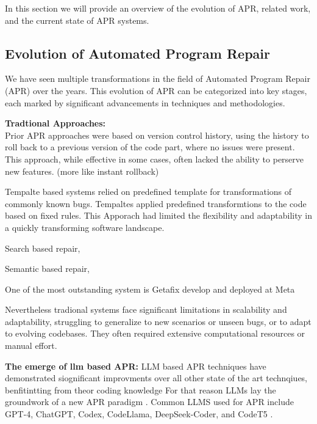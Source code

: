 In this section we will provide an overview of the evolution of APR, related work, and the current state of APR systems.

\subsection{Evolution of Automated Program Repair}
We have seen multiple transformations in the field of Automated Program Repair (APR) over the years. This evolution of APR can be categorized into key stages, each marked by significant advancements in techniques and methodologies.

\textbf{Tradtional Approaches:}\\
Prior APR approaches were based on version control history, using the history to roll back to a previous version of the code part, where no issues were present. This approach, while effective in some cases, often lacked the ability to perserve new features. (more like instant rollback)

Tempalte based systems relied on predefined template for transformations of commonly known bugs. Tempaltes applied predefined transformtions to the code based on fixed rules. This Apporach had limited the flexibility and adaptability in a quickly transforming software landscape. \cite{puvvadiCodingAgentsComprehensive2025}

Search based repair,

Semantic based repair,

One of the most outstanding system is Getafix develop and deployed at Meta \cite{baderGetafixLearningFix2019}

Nevertheless tradional systems face significant limitations in scalability and adaptability, struggling to generalize to new scenarios or unseen bugs, or to adapt to evolving codebases. They often required extensive computational resources or manual effort. \cite{puvvadiCodingAgentsComprehensive2025}


\textbf{The emerge of llm based APR:}
LLM based APR techniques have demonstrated siognificant improvments over all other state of the art technqiues, benfitintting from theor coding knowledge \cite{hossainDeepDiveLarge2024}For that reason LLMs lay the groundwork of a new APR paradigm \cite{chenUnveilingPitfallsUnderstanding2025}.
Common LLMS used for APR include GPT-4, ChatGPT, Codex, CodeLlama, DeepSeek-Coder, and CodeT5 \cite{houLargeLanguageModels2024, yinThinkRepairSelfDirectedAutomated2024,anandComprehensiveSurveyAIDriven2024}.

